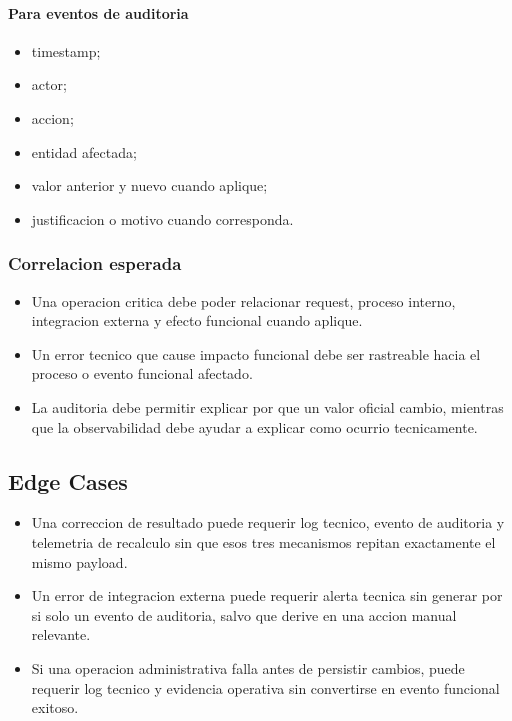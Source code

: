 \paragraph{Para eventos de auditoria}

\begin{itemize}
  \item timestamp;
  \item actor;
  \item accion;
  \item entidad afectada;
  \item valor anterior y nuevo cuando aplique;
  \item justificacion o motivo cuando corresponda.
\end{itemize}

\subsubsection{Correlacion esperada}

\begin{itemize}
  \item Una operacion critica debe poder relacionar request, proceso interno, integracion externa y efecto funcional cuando aplique.
  \item Un error tecnico que cause impacto funcional debe ser rastreable hacia el proceso o evento funcional afectado.
  \item La auditoria debe permitir explicar por que un valor oficial cambio, mientras que la observabilidad debe ayudar a explicar como ocurrio tecnicamente.
\end{itemize}

\subsection{Edge Cases}

\begin{itemize}
  \item Una correccion de resultado puede requerir log tecnico, evento de auditoria y telemetria de recalculo sin que esos tres mecanismos repitan exactamente el mismo payload.
  \item Un error de integracion externa puede requerir alerta tecnica sin generar por si solo un evento de auditoria, salvo que derive en una accion manual relevante.
  \item Si una operacion administrativa falla antes de persistir cambios, puede requerir log tecnico y evidencia operativa sin convertirse en evento funcional exitoso.
\end{itemize}


